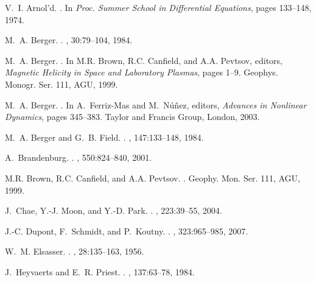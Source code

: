 \begin{thebibliography}{10}

V.~I. {Arnol'd}.
.
\newblock In {\em Proc. Summer School in Differential Equations}, pages
  133--148, 1974.

M.~A. {Berger}.
.
, 30:79--104, 1984.

M.~A. {Berger}.
.
\newblock In M.R. {Brown}, R.C. {Canfield}, and A.A. {Pevtsov}, editors, {\em
  Magnetic Helicity in Space and Laboratory Plasmas}, pages 1--9. Geophys.
  Monogr. Ser. 111, AGU, 1999.

M.~A. {Berger}.
.
\newblock In A.~{Ferriz-Mas} and M.~{N{\'u}{\~n}ez}, editors, {\em Advances in
  Nonlinear Dynamics}, pages 345--383. Taylor and Francis Group, London, 2003.

M.~A. {Berger} and G.~B. {Field}.
.
, 147:133--148, 1984.

A.~{Brandenburg}.
.
, 550:824--840, 2001.

M.R. {Brown}, R.C. {Canfield}, and A.A. {Pevtsov}.
.
\newblock Geophy. Mon. Ser. 111, AGU, 1999.

J.~{Chae}, Y.-J. {Moon}, and Y.-D. {Park}.
.
, 223:39--55, 2004.

J.-C. {Dupont}, F.~{Schmidt}, and P.~{Koutny}.
.
, 323:965--985, 2007.

W.~M. {Elsasser}.
.
, 28:135--163, 1956.

J.~{Heyvaerts} and E.~R. {Priest}.
.
, 137:63--78, 1984.


\end{thebibliography}

